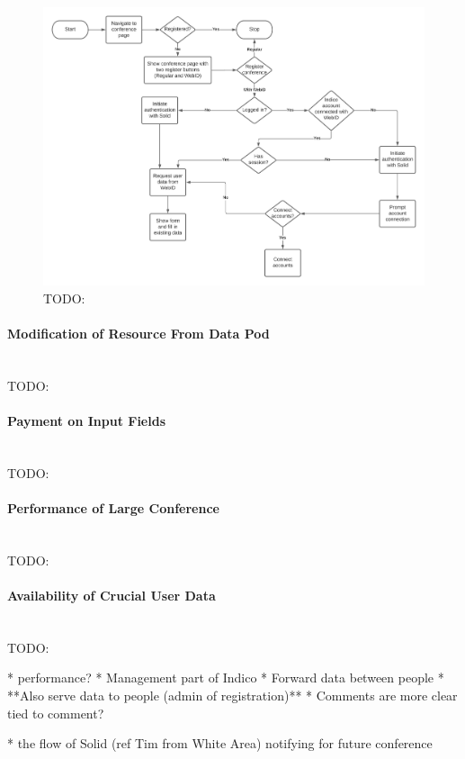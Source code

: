 \begin{figure}
    \centering
    \includegraphics[width=1\textwidth]{prototype/graphs/poc-conference_registration_flow-sideways.jpeg}
    \caption{TODO:}
    \label{fig:poc-conference_registration_flow-sideways}
\end{figure}
\vspace{0.5cm}
\paragraph{Modification of Resource From Data Pod}\mbox{}\\

TODO:
\vspace{0.5cm}
\paragraph{Payment on Input Fields}\mbox{}\\

TODO:
\vspace{0.5cm}
\paragraph{Performance of Large Conference}\mbox{}\\

TODO:
\vspace{0.5cm}
\paragraph{Availability of Crucial User Data}\mbox{}\\

TODO:


* performance?
* Management part of Indico
  * Forward data between people
  * **Also serve data to people (admin of registration)**
* Comments are more clear tied to comment?

* the flow of Solid (ref Tim from White Area) notifying for future conference